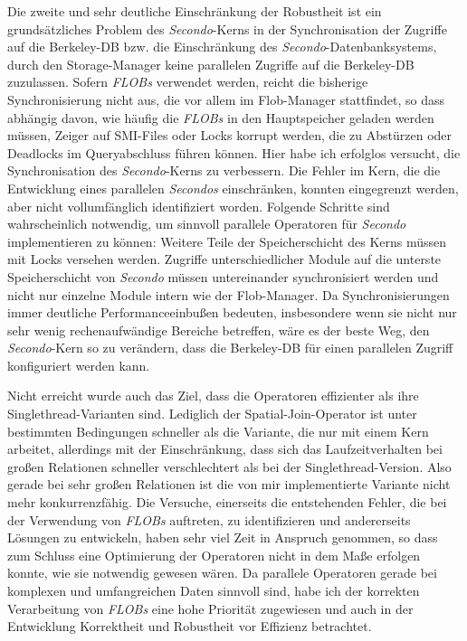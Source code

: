 \documentclass[a4paper,12pt,twoside]{article}
\newcommand{\Fb}[1]{\textit{#1}} %
\begin{document}
Die zweite und sehr deutliche Einschränkung der Robustheit ist ein grundsätzliches Problem des \Fb{Secondo}-Kerns in der Synchronisation der Zugriffe auf die Berkeley-DB bzw. die Einschränkung des \Fb{Secondo}-Datenbanksystems, durch den Storage-Manager keine parallelen Zugriffe auf die Berkeley-DB zuzulassen. Sofern \Fb{FLOBs} verwendet werden, reicht die bisherige Synchronisierung nicht aus, die vor allem im Flob-Manager stattfindet, so dass abhängig davon, wie häufig die \Fb{FLOBs} in den Hauptspeicher geladen werden müssen, Zeiger auf SMI-Files oder Locks korrupt werden, die zu Abstürzen oder Deadlocks im Queryabschluss führen können. Hier habe ich erfolglos versucht, die Synchronisation des \Fb{Secondo}-Kerns zu verbessern. Die Fehler im Kern, die die Entwicklung eines parallelen \Fb{Secondos} einschränken, konnten eingegrenzt werden, aber nicht vollumfänglich identifiziert worden. Folgende Schritte sind wahrscheinlich notwendig, um sinnvoll parallele Operatoren für \Fb{Secondo} implementieren zu können: Weitere Teile der Speicherschicht des Kerns müssen mit Locks versehen werden. Zugriffe unterschiedlicher Module auf die unterste Speicherschicht von \Fb{Secondo} müssen untereinander synchronisiert werden und nicht nur einzelne Module intern wie der Flob-Manager. Da Synchronisierungen immer deutliche Performanceeinbußen bedeuten, insbesondere wenn sie nicht nur sehr wenig rechenaufwändige Bereiche betreffen, wäre es der beste Weg, den \Fb{Secondo}-Kern so zu verändern, dass die Berkeley-DB für einen parallelen Zugriff konfiguriert werden kann. 

Nicht erreicht wurde auch das Ziel, dass die Operatoren effizienter als ihre Singlethread-Varianten sind. Lediglich der Spatial-Join-Operator ist unter bestimmten Bedingungen schneller als die Variante, die nur mit einem Kern arbeitet, allerdings mit der Einschränkung, dass sich das Laufzeitverhalten bei großen Relationen schneller verschlechtert als bei der Singlethread-Version. Also gerade bei sehr großen Relationen ist die von mir implementierte Variante nicht mehr konkurrenzfähig. Die Versuche, einerseits die entstehenden Fehler, die bei der Verwendung von \Fb{FLOBs} auftreten, zu identifizieren und andererseits Lösungen zu entwickeln, haben sehr viel Zeit in Anspruch genommen, so dass zum Schluss eine Optimierung der Operatoren nicht in dem Maße erfolgen konnte, wie sie notwendig gewesen wären. Da parallele Operatoren gerade bei komplexen und umfangreichen Daten sinnvoll sind, habe ich der korrekten Verarbeitung von \Fb{FLOBs} eine hohe Priorität zugewiesen und auch in der Entwicklung Korrektheit und Robustheit vor Effizienz betrachtet.
\end{document}
